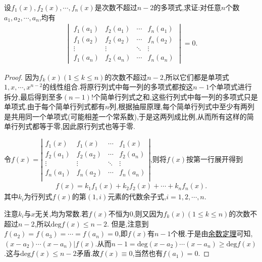 \documentclass[../../main.tex]{subfiles}%
\begin{document}
\begin{proposition}\label{proposition:元素都是多项式的行列式值为零}
设\(f_1(x), f_2(x), \cdots, f_n(x)\)是次数不超过\(n - 2\)的多项式,求证:对任意\(n\)个数\(a_1, a_2, \cdots, a_n\),均有
\begin{align*}
\begin{vmatrix}
f_1(a_1) & f_2(a_1) & \cdots & f_n(a_1) \\
f_1(a_2) & f_2(a_2) & \cdots & f_n(a_2) \\
\vdots & \vdots & \ddots & \vdots \\
f_1(a_n) & f_2(a_n) & \cdots & f_n(a_n)
\end{vmatrix} = 0.
\end{align*}
\end{proposition}
\begin{proof}

{\color{blue}}
因为\(f_k(x)(1 \leqslant  k \leqslant  n)\)的次数不超过\(n - 2\),所以它们都是单项式\(1,x,\cdots,x^{n - 2}\)的线性组合.将原行列式中每一列的多项式都按这\(n - 1\)个单项式进行拆分,最后得到至多$(n-1)!$个简单行列式之和,这些行列式中每一列的多项式只是单项式.由于每个简单行列式都有\(n\)列,根据抽屉原理,每个简单行列式中至少有两列是共用同一个单项式(可能相差一个常系数),于是这两列成比例,从而所有这样的简单行列式都等于零,因此原行列式也等于零.

{\color{blue}}
令$f\left( x \right) =\left| \begin{matrix}
f_1(x)&		f_1(x)&		\cdots&		f_1(x)\\
f_2(a_1)&		f_2(a_2)&		\cdots&		f_2(a_n)\\
\vdots&		\vdots&		\ddots&		\vdots\\
f_n(a_1)&		f_n(a_2)&		\cdots&		f_n(a_n)\\
\end{matrix} \right|$,则将$f(x)$按第一行展开得到
\begin{align*}
f\left( x \right) =k_1f_1\left( x \right) +k_2f_2\left( x \right) +\cdots +k_nf_n\left( x \right) .
\end{align*}
其中$k_i$为行列式$f\left( x \right)$的第$\left( 1,i \right)$元素的代数余子式,$i=1,2,\cdots ,n$.

注意$k_i$与$x$无关,均为常数.若$f(x)$不恒为0,则又因为\(f_k(x)(1 \leqslant  k \leqslant  n)\)的次数不超过\(n - 2\),所以$\mathrm{deg}f(x)\leqslant n-2$.
但是,注意到$f(a_2)=f(a_3)=\cdots=f(a_n)=0$,即$f(x)$有$n-1$个根.于是由\hyperlink{余数定理}{余数定理}可知,$\left( x-a_2 \right) \cdots \left( x-a_n \right) |f\left( x \right)$.从而$n-1=\mathrm{deg}\left( x-a_2 \right) \cdots \left( x-a_n \right) \geqslant \mathrm{deg}f\left( x \right)$.这与$\mathrm{deg}f(x)\leqslant n-2$矛盾.故$f(x)\equiv 0$,当然也有$f(a_1)=0$.


\end{proof}
\end{document}
